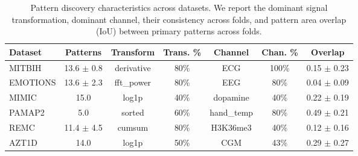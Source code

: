 \begin{table}[H]
\centering
\caption{Pattern discovery characteristics across datasets. We report the dominant
signal transformation, dominant channel, their consistency across folds, and
pattern area overlap (IoU) between primary patterns across folds.}
\label{tab:pattern_stability}
\footnotesize
\begin{tabular*}{\textwidth}{@{\extracolsep{\fill}}lcccccc@{}}
\toprule
\textbf{Dataset} & \textbf{Patterns} & \textbf{Transform} & \textbf{Trans. \%} & 
\textbf{Channel} & \textbf{Chan. \%} & \textbf{Overlap} \\
\midrule
MITBIH & 13.6 $\pm$ 0.8 & derivative & 80\% & ECG & 100\% & 0.15 $\pm$ 0.23 \\
EMOTIONS & 13.6 $\pm$ 2.3 & fft\_power & 80\% & EEG & 80\% & 0.04 $\pm$ 0.09 \\
MIMIC & 15.0 & log1p & 40\% & dopamine & 40\% & 0.22 $\pm$ 0.19 \\
PAMAP2 & 5.0 & sorted & 60\% & hand\_temp & 80\% & 0.49 $\pm$ 0.21 \\
REMC & 11.4 $\pm$ 4.5 & cumsum & 80\% & H3K36me3 & 40\% & 0.12 $\pm$ 0.16 \\
AZT1D & 14.0 & log1p & 50\% & CGM & 43\% & 0.29 $\pm$ 0.27 \\
\bottomrule
\end{tabular*}
\end{table}
